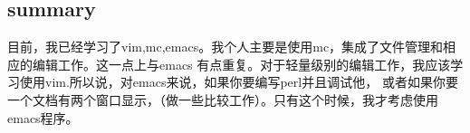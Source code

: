 \documentclass[a4paper,12pt,twoside]{book}
\begin{document}
\begin{CJK*}{UTF8}{song}
\subsection{summary}
目前，我已经学习了vim,mc,emacs。我个人主要是使用mc，集成了文件管理和相应的编辑工作。这一点上与emacs 有点重复。对于轻量级别的编辑工作，我应该学习使用vim.所以说，对emacs来说，如果你要编写perl并且调试他， 或者如果你要一个文档有两个窗口显示，（做一些比较工作）。只有这个时候，我才考虑使用emacs程序。



\ifx \allfiles \undefined
\end{CJK*}
\end{document}
